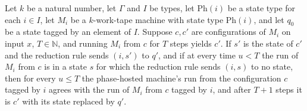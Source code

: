\begin{theorem}
\label{Turing.phaseHostTM_run}
\leanok
{}
Let $k$ be a natural number, let $\Gamma$ and $I$ be types, let $\mathrm{Ph}(i)$ be a
state type for each $i\in I$, let $M_i$ be a $k$-work-tape machine with state type
$\mathrm{Ph}(i)$, and let $q_0$ be a state tagged by an element of $I$. Suppose $c,c'$
are configurations of $M_i$ on input $x$, $T\in\mathbb{N}$, and running $M_i$ from $c$
for $T$ steps yields $c'$. If $s'$ is the state of $c'$ and the reduction rule sends
$(i,s')$ to $q'$, and if at every time $u<T$ the run of $M_i$ from $c$ is in a state $s$
for which the reduction rule sends $(i,s)$ to no state, then for every $u\le T$ the
phase-hosted machine's run from the configuration $c$ tagged by $i$ agrees with the run
of $M_i$ from $c$ tagged by $i$, and after $T+1$ steps it is $c'$ with its state
replaced by $q'$.
\end{theorem}
